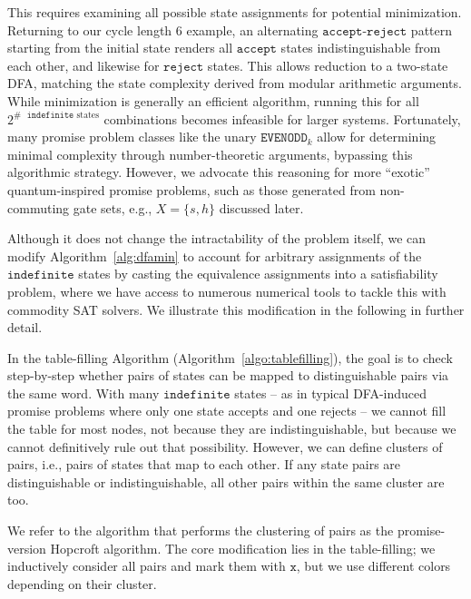 \documentclass[../main.tex]{subfiles}
\begin{document}
This requires examining all possible state assignments for potential minimization. Returning to our cycle length 6 example, an alternating $\mathtt{accept}$-$\mathtt{reject}$  pattern starting from the initial state renders all $\mathtt{accept}$ states indistinguishable from each other, and likewise for $\mathtt{reject}$  states. This allows reduction to a two-state DFA, matching the state complexity derived from modular arithmetic arguments. 
While minimization is generally an efficient algorithm, running this for all $2^{\text{$\#$ $\mathtt{indefinite}$ states}}$ combinations becomes infeasible for larger systems. Fortunately, many promise problem classes like the unary $\mathtt{EVENODD}_k$ allow for determining minimal complexity through number-theoretic arguments, bypassing this algorithmic strategy. However, we advocate this reasoning for more ``exotic'' quantum-inspired promise problems, such as those generated from non-commuting gate sets, e.g., $X = \{s,h \}$ discussed later.

Although it does not change the intractability of the problem itself, we can modify Algorithm~\ref{alg:dfamin} to account for arbitrary assignments of the $\mathtt{indefinite}$ states by casting the equivalence assignments into a satisfiability problem, where we have access to numerous numerical tools to tackle this with commodity SAT solvers. We illustrate this modification in the following in further detail.

In the table-filling Algorithm (Algorithm~\ref{algo:tablefilling}), the goal is to check step-by-step whether pairs of states can be mapped to distinguishable pairs via the same word. With many $\mathtt{indefinite}$ states -- as in typical DFA-induced promise problems where only one state accepts and one rejects -- we cannot fill the table for most nodes, not because they are indistinguishable, but because we cannot definitively rule out that possibility. However, we can define clusters of pairs, i.e., pairs of states that map to each other. If any state pairs are distinguishable or indistinguishable, all other pairs within the same cluster are too.

We refer to the algorithm that performs the clustering of pairs as the promise-version Hopcroft algorithm. The core modification lies in the table-filling; we inductively consider all pairs and mark them with $\mathtt{x}$, but we use different colors depending on their cluster.
\end{document}
